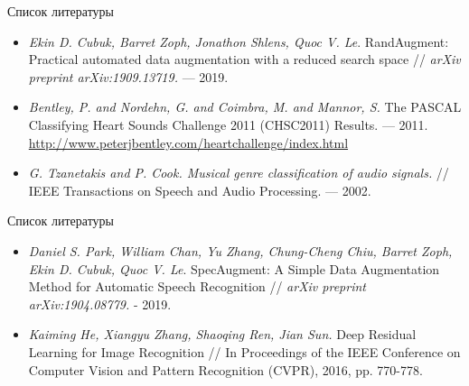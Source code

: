 \documentclass[12pt, fleqn]{beamer}
\begin{document}
\begin{frame}{Список литературы}
\begin{itemize}
\item \textit{Ekin D. Cubuk, Barret Zoph, Jonathon Shlens, Quoc V. Le}. RandAugment: Practical automated data augmentation with a reduced search space // \textit{arXiv preprint arXiv:1909.13719.} --- 2019.
\item \textit{Bentley, P. and Nordehn, G. and Coimbra, M. and Mannor, S.} The {PASCAL} {C}lassifying {H}eart {S}ounds {C}hallenge 2011 {(CHSC2011)} {R}esults. --- 2011.
\url{http://www.peterjbentley.com/heartchallenge/index.html}
\item \textit{G. Tzanetakis and P. Cook. Musical genre classification of audio signals.}    // IEEE Transactions on Speech and Audio Processing. --- 2002.
\end{itemize}
\end{frame}

\begin{frame}{Список литературы}
\begin{itemize}
\item \textit{Daniel S. Park, William Chan, Yu Zhang, Chung-Cheng Chiu, Barret Zoph, Ekin D. Cubuk, Quoc V. Le}. SpecAugment: A Simple Data Augmentation Method
for Automatic Speech Recognition // \textit{arXiv preprint arXiv:1904.08779.} - 2019.
\item \textit{Kaiming He, Xiangyu Zhang, Shaoqing Ren, Jian Sun.} Deep Residual Learning for Image Recognition // In Proceedings of the IEEE Conference on Computer Vision and Pattern Recognition (CVPR), 2016, pp. 770-778.
\end{itemize}
\end{frame}
\end{document}
